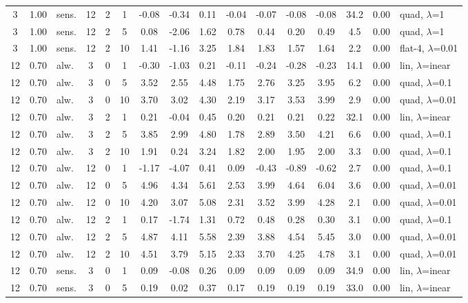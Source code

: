 \begin{scriptsize}
\begin{longtable}{cclcc c ccc ccc c cc l}
3 & 1.00 & sens. & 12 & 2 & 1 & -0.08 & -0.34 & 0.11 & -0.04 & -0.07 & -0.08 & -0.08 & 34.2 & 0.00 & quad, $\lambda$=1 \\
3 & 1.00 & sens. & 12 & 2 & 5 & 0.08 & -2.06 & 1.62 & 0.78 & 0.44 & 0.20 & 0.49 & 4.5 & 0.00 & quad, $\lambda$=1 \\
3 & 1.00 & sens. & 12 & 2 & 10 & 1.41 & -1.16 & 3.25 & 1.84 & 1.83 & 1.57 & 1.64 & 2.2 & 0.00 & flat-4, $\lambda$=0.01 \\
12 & 0.70 & alw. & 3 & 0 & 1 & -0.30 & -1.03 & 0.21 & -0.11 & -0.24 & -0.28 & -0.23 & 14.1 & 0.00 & lin, $\lambda$=inear \\
12 & 0.70 & alw. & 3 & 0 & 5 & 3.52 & 2.55 & 4.48 & 1.75 & 2.76 & 3.25 & 3.95 & 6.2 & 0.00 & quad, $\lambda$=0.1 \\
12 & 0.70 & alw. & 3 & 0 & 10 & 3.70 & 3.02 & 4.30 & 2.19 & 3.17 & 3.53 & 3.99 & 2.9 & 0.00 & quad, $\lambda$=0.01 \\
12 & 0.70 & alw. & 3 & 2 & 1 & 0.21 & -0.04 & 0.45 & 0.20 & 0.21 & 0.21 & 0.22 & 32.1 & 0.00 & lin, $\lambda$=inear \\
12 & 0.70 & alw. & 3 & 2 & 5 & 3.85 & 2.99 & 4.80 & 1.78 & 2.89 & 3.50 & 4.21 & 6.6 & 0.00 & quad, $\lambda$=0.1 \\
12 & 0.70 & alw. & 3 & 2 & 10 & 1.91 & 0.24 & 3.24 & 1.82 & 2.00 & 1.95 & 2.00 & 3.3 & 0.00 & quad, $\lambda$=0.1 \\
12 & 0.70 & alw. & 12 & 0 & 1 & -1.17 & -4.07 & 0.41 & 0.09 & -0.43 & -0.89 & -0.62 & 2.7 & 0.00 & quad, $\lambda$=0.1 \\
12 & 0.70 & alw. & 12 & 0 & 5 & 4.96 & 4.34 & 5.61 & 2.53 & 3.99 & 4.64 & 6.04 & 3.6 & 0.00 & quad, $\lambda$=0.01 \\
12 & 0.70 & alw. & 12 & 0 & 10 & 4.20 & 3.07 & 5.08 & 2.31 & 3.52 & 3.99 & 4.28 & 2.1 & 0.00 & quad, $\lambda$=0.01 \\
12 & 0.70 & alw. & 12 & 2 & 1 & 0.17 & -1.74 & 1.31 & 0.72 & 0.48 & 0.28 & 0.30 & 3.1 & 0.00 & quad, $\lambda$=0.1 \\
12 & 0.70 & alw. & 12 & 2 & 5 & 4.87 & 4.11 & 5.58 & 2.39 & 3.88 & 4.54 & 5.45 & 3.0 & 0.00 & quad, $\lambda$=0.01 \\
12 & 0.70 & alw. & 12 & 2 & 10 & 4.51 & 3.79 & 5.15 & 2.33 & 3.70 & 4.25 & 4.78 & 3.1 & 0.00 & quad, $\lambda$=0.01 \\
12 & 0.70 & sens. & 3 & 0 & 1 & 0.09 & -0.08 & 0.26 & 0.09 & 0.09 & 0.09 & 0.09 & 34.9 & 0.00 & lin, $\lambda$=inear \\
12 & 0.70 & sens. & 3 & 0 & 5 & 0.19 & 0.02 & 0.37 & 0.17 & 0.19 & 0.19 & 0.19 & 33.0 & 0.00 & lin, $\lambda$=inear \\

\end{longtable}
\end{scriptsize}
